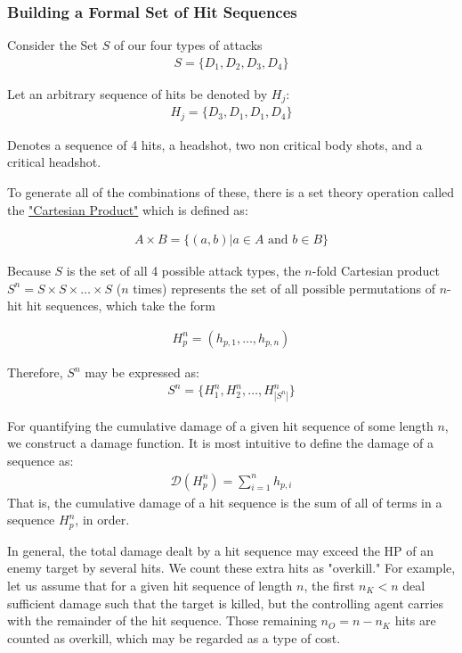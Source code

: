 \documentclass{article}
\begin{document}
\subsubsection{Building a Formal Set of Hit Sequences}

	Consider the Set $S$ of our four types of attacks
\begin{align*}
S = \{ D_1, D_2, D_3, D_4 \}
\end{align*}

	Let an arbitrary sequence of hits be denoted by $H_j$:
\begin{align*}
H_j = \{ D_3, D_1, D_1, D_4 \} 
\end{align*}

	Denotes a sequence of 4 hits, a headshot, two non critical body shots, and a critical headshot.

	To generate all of the combinations of these, there is a set theory operation called the \href{https://en.wikipedia.org/wiki/Cartesian_product}{"Cartesian Product"} which is defined as:

\begin{align*}
A \times B = \{ (a,b) | a\in A \text{ and } b \in B\} 
\end{align*}

	Because $S$ is the set of all 4 possible attack types, the $n$-fold Cartesian product $S^n=S\times S\times \ldots \times S$ ($n$ times) represents the set of all possible permutations of $n$-hit hit sequences, which take the form  

\begin{align*}
H^n_p = (h_{p,1},\ldots,h_{p,n})
\end{align*} 

	Therefore, $S^n$ may be expressed as:
\begin{align*}
S^n=\{ H^n_1,H^n_2,\ldots,H^n_{|S^n|}\}
\end{align*}
    

	For quantifying the cumulative damage of a given hit sequence of some length $n$, we construct a damage function. It is most intuitive to define the damage of a sequence as:
\begin{align*}
\mathcal{D} (H^n_p)=\sum _{i=1}^{n} h_{p,i}
\end{align*}
That is, the cumulative damage of a hit sequence is the sum of all of terms in a sequence $H^n_p$, in order.
    

	In general, the total damage dealt by a hit sequence may exceed the HP of an enemy target by several hits. We count these extra hits as "overkill." For example, let us assume that for a given hit sequence of length $n$, the first $n_{K}<n$ deal sufficient damage such that the target is killed, but the controlling agent carries with the remainder of the hit sequence. Those remaining $n_{O}=n-n_{K}$ hits are counted as overkill, which may be regarded as a type of cost. 
 
\end{document}
